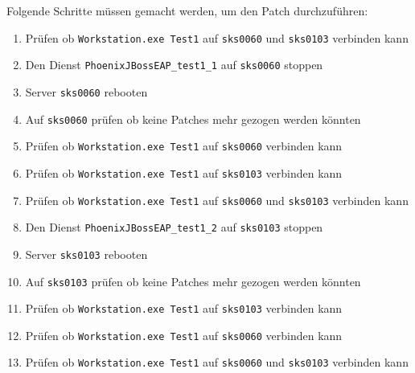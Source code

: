 \begin{flushleft}
    Folgende Schritte müssen gemacht werden, um den Patch durchzuführen:
    \begin{enumerate}
        \item Prüfen ob \texttt{Workstation.exe Test1} auf \texttt{sks0060} und \texttt{sks0103} verbinden kann
        \item Den Dienst \texttt{PhoenixJBossEAP\_test1\_1} auf \texttt{sks0060} stoppen
        \item Server \texttt{sks0060} rebooten
        \item Auf \texttt{sks0060} prüfen ob keine Patches mehr gezogen werden könnten
        \item Prüfen ob \texttt{Workstation.exe Test1} auf \texttt{sks0060} verbinden kann
        \item Prüfen ob \texttt{Workstation.exe Test1} auf \texttt{sks0103} verbinden kann
        \item Prüfen ob \texttt{Workstation.exe Test1} auf \texttt{sks0060} und \texttt{sks0103} verbinden kann
        \item Den Dienst \texttt{PhoenixJBossEAP\_test1\_2} auf \texttt{sks0103} stoppen
        \item Server \texttt{sks0103} rebooten
        \item Auf \texttt{sks0103} prüfen ob keine Patches mehr gezogen werden könnten
        \item Prüfen ob \texttt{Workstation.exe Test1} auf \texttt{sks0103} verbinden kann
        \item Prüfen ob \texttt{Workstation.exe Test1} auf \texttt{sks0060} verbinden kann
        \item Prüfen ob \texttt{Workstation.exe Test1} auf \texttt{sks0060} und \texttt{sks0103} verbinden kann
    \end{enumerate}
\end{flushleft}
